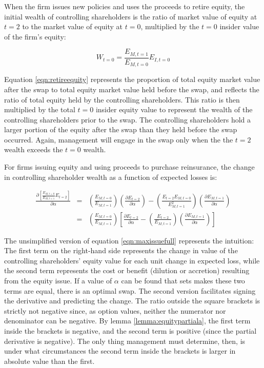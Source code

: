 When the firm issues new policies and uses the proceeds to retire equity, the initial wealth of controlling shareholders is the ratio of market value of equity at $t=2$ to the market value of equity at $t=0$, multiplied by the $t=0$ insider value of the firm's equity:

\begin{equation}\label{eqn:retireequity}
W_{t=0}=\frac{E_{M,t=1}}{E_{M,t=0}}E_{I,t=0}
\end{equation}

Equation \ref{eqn:retireequity} represents the proportion of total equity market value after the swap to total equity market value held before the swap, and reflects the ratio of total equity held by the controlling shareholders.  This ratio is then multiplied by the total $t=0$ insider equity value to represent the wealth of the controlling shareholders prior to the swap.  The controlling shareholders hold a larger portion of the equity after the swap than they held before the swap occurred.  Again, management will engage in the swap only when the the $t=2$ wealth exceeds the $t=0$ wealth.

For firms issuing equity and using proceeds to purchase reinsurance, the change in controlling shareholder wealth as a function of expected losses is:

\begin{eqnarray}\label{eqn:maxissuefull}
\frac{\partial
\displaystyle\left[\frac{E_{M,t=0}}{E_{M,t=1}}E_{t=2}\right]}{\partial\alpha}&=&\left(\frac{E_{M,t=0}}{E_{M,t=1}}\right)\left(\frac{\partial E_{t=2}}{\partial \alpha}\right)-\left(\frac{E_{t=2}E_{M,t=0}}{E^2_{M,t=1}}\right)\left(\frac{\partial E_{M,t=1}}{\partial \alpha}\right) \nonumber \\
&=& \left(\frac{E_{M,t=0}}{E_{M,t=1}}\right) \left[\frac{\partial E_{t=2}}{\partial \alpha}-\left(\frac{E_{t=2}}{E_{M,t=1}}\right)\left(\frac{\partial E_{M,t=1}}{\partial \alpha}\right)\right]
\end{eqnarray}

The unsimplified version of equation \ref{eqn:maxissuefull} represents the intuition: The first term on the right-hand side represents the change in value of the controlling shareholders' equity value for each unit change in expected loss, while the second term represents the cost or benefit (dilution or accretion) resulting from the equity issue. If a value of $\alpha$ can be found that sets makes these two terms are equal, there is an optimal swap. The second version facilitates signing the derivative and predicting the change. The ratio outside the square brackets is strictly not negative since, as option values, neither the numerator nor denominator can be negative.  By lemma \ref{lemma:equitypartiala}, the first term inside the brackets is negative, and the second term is positive (since the partial derivative is negative).   The only thing management must determine, then, is under what circumstances the second term inside the brackets is larger in absolute value than the first.  

